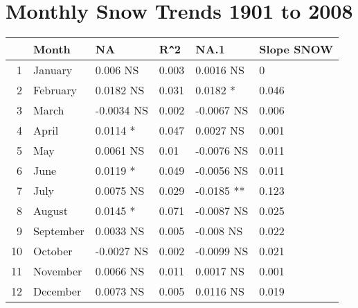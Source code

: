 \documentclass{article}\usepackage[]{graphicx}\usepackage[]{color}
\begin{document}
\section*{Monthly Snow Trends 1901 to 2008}
\begin{table}[ht]
\centering
\begin{tabular}{rlllll}
  \hline
 & Month & NA & R\verb|^|2 & NA.1 & Slope SNOW \\ 
  \hline
1 & January & 0.006 NS & 0.003 & 0.0016 NS & 0 \\ 
  2 & February & 0.0182 NS & 0.031 & 0.0182 * & 0.046 \\ 
  3 & March & -0.0034 NS & 0.002 & -0.0067 NS & 0.006 \\ 
  4 & April & 0.0114 * & 0.047 & 0.0027 NS & 0.001 \\ 
  5 & May & 0.0061 NS & 0.01 & -0.0076 NS & 0.011 \\ 
  6 & June & 0.0119 * & 0.049 & -0.0056 NS & 0.011 \\ 
  7 & July & 0.0075 NS & 0.029 & -0.0185 ** & 0.123 \\ 
  8 & August & 0.0145 * & 0.071 & -0.0087 NS & 0.025 \\ 
  9 & September & 0.0033 NS & 0.005 & -0.008 NS & 0.022 \\ 
  10 & October & -0.0027 NS & 0.002 & -0.0099 NS & 0.021 \\ 
  11 & November & 0.0066 NS & 0.011 & 0.0017 NS & 0.001 \\ 
  12 & December & 0.0073 NS & 0.005 & 0.0116 NS & 0.019 \\ 
   \hline
\end{tabular}
\end{table}
\end{document}
